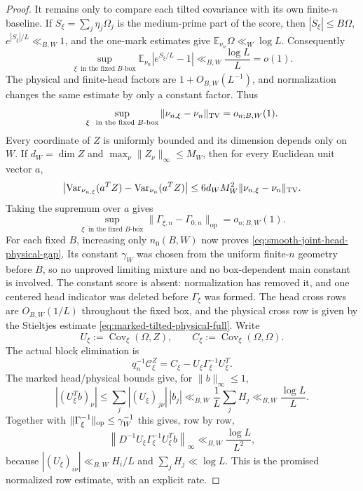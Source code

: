 \documentclass[11pt]{article}
\numberwithin{equation}{section}
\theoremstyle{definition}
\theoremstyle{remark}
\newcommand{\1}{\mathbf 1}
\begin{document}
\begin{proof}
It remains only to compare each tilted covariance with its own
finite-\(n\) baseline.  If
\(S_\xi=\sum_j\eta_j\Omega_j\) is the medium-prime part of the score,
then \(|S_\xi|\leq B\Omega\),
\(e^{|S_\xi|/L}\ll_{B,W}1\), and the one-mark estimates give
\(\mathbb E_{\nu_n}\Omega\ll_W\log L\).  Consequently
\[
 \sup_{\xi\ \text{ in the fixed }B\text{-box}}
 \mathbb E_{\nu_n}\left|e^{S_\xi/L}-1\right|
 \ll_{B,W}\frac{\log L}{L}=o(1).
\]
The physical and finite-head factors are
\(1+O_{B,W}(L^{-1})\), and normalization changes the same estimate by
only a constant factor.  Thus
\[
 \sup_{\xi\ \text{ in the fixed }B\text{-box}}
 \|\nu_{n,\xi}-\nu_n\|_{\rm TV}=o_{n;B,W}(1).
\]
Every coordinate of \(Z\) is uniformly bounded and its dimension depends
only on \(W\).  If \(d_W=\dim Z\) and
\(\max_\nu\|Z_\nu\|_\infty\leq M_W\), then for every Euclidean unit
vector \(a\),
\[
 \left|\operatorname{Var}_{\nu_{n,\xi}}(a^TZ)
       -\operatorname{Var}_{\nu_n}(a^TZ)\right|
 \leq 6d_WM_W^2\|\nu_{n,\xi}-\nu_n\|_{\rm TV}.
\]
Taking the supremum over \(a\) gives
\[
 \sup_{\xi\ \text{ in the fixed }B\text{-box}}
       \|\Gamma_{\xi,n}-\Gamma_{0,n}\|_{\mathrm{op}}
       =o_{n;B,W}(1).
\]
For each fixed \(B\), increasing only \(n_0(B,W)\) now proves
\eqref{eq:smooth-joint-head-physical-gap}.  Its constant
\(\gamma_W\) was chosen from the uniform finite-\(n\) geometry before
\(B\), so no unproved limiting mixture and no box-dependent main
constant is involved.
The constant score is absent: normalization has removed it, and one
centered head indicator was deleted before \(\Gamma_\xi\) was formed.
The head cross rows are
\(O_{B,W}(1/L)\) throughout the fixed box, and the physical cross row is
given by the Stieltjes
estimate \eqref{eq:marked-tilted-physical-full}.  Write
\[
 U_\xi:=\operatorname{Cov}_\xi(\Omega,Z),\qquad
 C_\xi:=\operatorname{Cov}_\xi(\Omega,\Omega).
\]
The actual block elimination is
\begin{equation}
 q_n^{-1}\mathcal C^Z_\xi
 =C_\xi-U_\xi\Gamma_\xi^{-1}U_\xi^T.
 \label{eq:smooth-displayed-joint-block-elimination}
\end{equation}
The marked head/physical bounds give, for \(\|b\|_\infty\le1\),
\[
 |(U_\xi^Tb)_\nu|
 \leq\sum_j|(U_\xi)_{j\nu}|\,|b_j|
 \ll_{B,W}\frac1L\sum_jH_j
 \ll_{B,W}\frac{\log L}{L}.
\]
Together with \(\|\Gamma_\xi^{-1}\|_{\rm op}\leq\gamma_W^{-1}\) this
gives, row by row,
\begin{equation}
 \left\|D^{-1}U_\xi\Gamma_\xi^{-1}U_\xi^Tb\right\|_\infty
 \ll_{B,W}\frac{\log L}{L^2},
 \label{eq:smooth-joint-Schur-row-error}
\end{equation}
because \(|(U_\xi)_{i\nu}|\ll_{B,W}H_i/L\) and
\(\sum_jH_j\ll\log L\).  This is the promised normalized row estimate,
with an explicit rate.


\end{proof}
\end{document}
